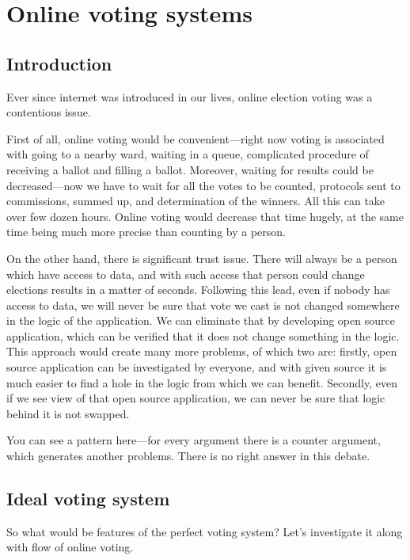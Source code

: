 \documentclass[a4paper,twoside,12pt]{book}
\begin{document}
\chapter{Online voting systems}

\section{Introduction}

	Ever since internet was introduced in our lives, online election voting was a contentious issue.

	First of all, online voting would be convenient---right now voting is associated with going to a nearby ward, waiting in a queue, 
	complicated procedure of receiving a ballot and filling a ballot.
	Moreover, waiting for results could be decreased---now we have to wait for all the votes to be counted, protocols sent to commissions,
	summed up, and determination of the winners. All this can take over few dozen hours.
	Online voting would decrease that time hugely, at the same time being much more precise than counting by a person.
	
	On the other hand, there is significant trust issue. There will always be a person which have access to data, 
	and with such access that person could change elections results in a matter of seconds.
	Following this lead, even if nobody has access to data, we will never be sure that vote we cast is not changed somewhere in the logic of the application.
	We can eliminate that by developing open source application, which can be verified that it does not change something in the logic.
	This approach would create many more problems, of which two are: firstly, open source application can be investigated by everyone, 
	and with given source it is much easier to find a hole in the logic from which we can benefit.
	Secondly, even if we see view of that open source application, we can never be sure that logic behind it is not swapped.
	
	You can see a pattern here---for every argument there is a counter argument, which generates another problems. 
	There is no right answer in this debate.

\section{Ideal voting system}

  So what would be features of the perfect voting system? Let's investigate it along with flow of online voting.
\end{document}

